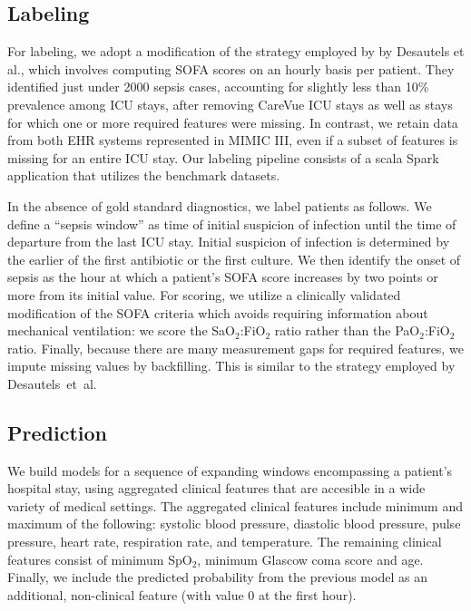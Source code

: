 \documentclass{amia}
\begin{document}
\subsection*{Labeling}
For labeling, we adopt a modification of the strategy employed by by Desautels et al.,\cite{desautels2016} which
involves computing SOFA scores on an hourly basis per patient.
They identified just under 2000 sepsis cases, accounting for slightly less than 10\% prevalence among
ICU stays, after removing CareVue ICU stays as well as stays for which one or more required features were missing. 
In contrast, we retain data from both EHR systems represented in MIMIC III, even
if a subset of features is missing for an entire ICU stay.  Our labeling pipeline consists of a scala Spark
application that utilizes the benchmark datasets.

In the absence of gold standard diagnostics,
we label patients as follows.  We define a ``sepsis window'' as time of initial suspicion of infection
until the time of departure from the last ICU stay.  Initial suspicion of infection is determined by 
the earlier of the first antibiotic or the first culture.  We then identify the onset of sepsis 
as the hour at which a patient's SOFA score increases by two points or more from its initial value.  
For scoring, we utilize a clinically validated modification of the SOFA criteria which avoids requiring
information about mechanical ventilation:\cite{jones2009}  we score the SaO$_2$:FiO$_2$ ratio rather 
than the PaO$_2$:FiO$_2$ ratio.  Finally, because there are many measurement gaps for required features,
we impute missing values by backfilling.  This is similar to the strategy employed by Desautels~et~al.\cite{desautels2016}

\subsection*{Prediction}
We build models for a sequence of expanding windows encompassing a patient's hospital stay, using aggregated clinical 
features that are accesible in a wide variety of medical settings.  The aggregated clinical features include minimum and 
maximum of the following: systolic blood pressure, diastolic blood pressure, pulse pressure, heart rate, respiration rate, 
and temperature.  The remaining clinical features consist of minimum SpO$_2$, minimum Glascow coma score and age.  Finally, 
we include the predicted probability from the previous model as an additional, non-clinical feature (with value 0 at the
first hour).
\end{document}
